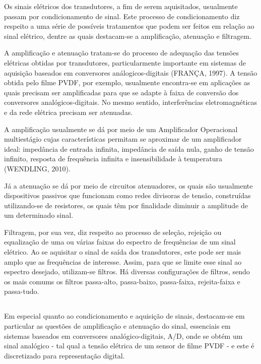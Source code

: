 \documentclass[
	12pt,				
	oneside,			
	a4paper,			
	english,			
	brazil,	
	sumario=abnt-6027-2012		
	]{abntex2ppgsi}
\begin{document}
Os sinais elétricos dos transdutores, a fim de serem aquisitados, usualmente passam por condicionamento de sinal. Este processo de condicionamento diz respeito a uma série de possíveis tratamentos que podem ser feitos em relação ao sinal elétrico, dentre as quais destacam-se a amplificação, atenuação e filtragem. 

A amplificação e atenuação tratam-se do processo de adequação das tensões elétricas obtidas por transdutores, particularmente importante em sistemas de aquisição baseados em conversores análogicos-digitais (FRANÇA, 1997). A tensão obtida pelo filme PVDF, por exemplo, usualmente encontra-se em aplicações as quais precisam ser amplificadas para que se adapte à faixa de conversão dos conversores analógicos-digitais. No mesmo sentido, interferências eletromagnéticas e da rede elétrica precisam ser atenuadas. 

A amplificação usualmente se dá por meio de um Amplificador Operacional multiestágio cujas características permitam se aproximar de um amplificador ideal: impedância de entrada infinita, impedância de saída nula, ganho de tensão infinito, resposta de frequência infinita e insensibilidade à temperatura (WENDLING, 2010). 

Já a atenuação se dá por meio de circuitos atenuadores, os quais são usualmente dispositivos passivos que funcionam como redes divisoras de tensão, construídas utilizando-se de resistores, os quais têm por finalidade diminuir a amplitude de um determinado sinal.


Filtragem, por sua vez, diz respeito ao processo de seleção, rejeição ou equalização de uma ou várias faixas do espectro de frequências de um sinal elétrico. Ao se aquisitar o sinal de saída dos transdutores, este pode ser mais amplo que as frequências de interesse. Assim, para que se limite esse sinal ao espectro desejado, utilizam-se filtros. Há diversas configurações de filtros, sendo os mais comums os filtros passa-alto, passa-baixo, passa-faixa, rejeita-faixa e passa-tudo. 


\subsection{}


Em especial quanto ao condicionamento e aquisição de sinais, destacam-se em particular as questões de amplificação e atenuação do sinal, essenciais em sistemas baseados em conversores analógico-digitais, A/D, onde se obtém um sinal analógico - tal qual a tensão elétrica de um sensor de filme PVDF - e este é discretizado para representação digital. 
\end{document}
